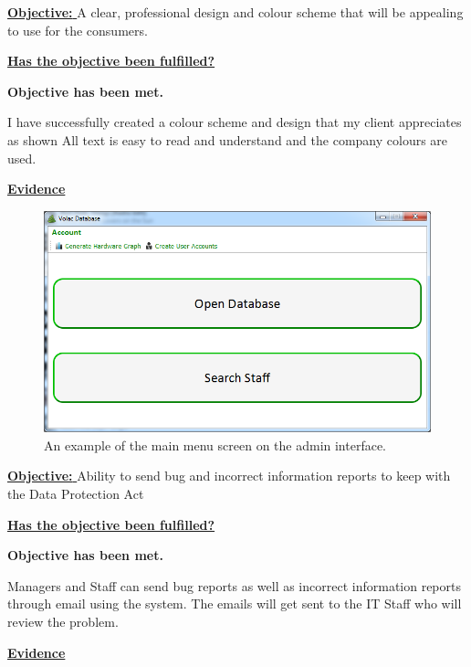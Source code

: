 \underline{\textbf{Objective:} } A clear, professional design and colour scheme that will be appealing to use for the consumers.

\underline{\textbf{Has the objective been fulfilled?}}

\textbf{Objective has been met.}

I have successfully created a colour scheme and design that my client appreciates as shown  All text is easy to read and understand and the company colours are used.

\underline{\textbf{Evidence}}

\begin{figure}[H]
    \includegraphics[width=\textwidth]{./Manual/Images/graph.png}
    \caption{An example of the main menu screen on the admin interface.} 
\end{figure}

\underline{\textbf{Objective:} } Ability to send bug and incorrect information reports to keep with the Data Protection Act

\underline{\textbf{Has the objective been fulfilled?}}

\textbf{Objective has been met.}

Managers and Staff can send bug reports as well as incorrect information reports through email using the system. The emails will get sent to the IT Staff who will review the problem. 

\underline{\textbf{Evidence}}

